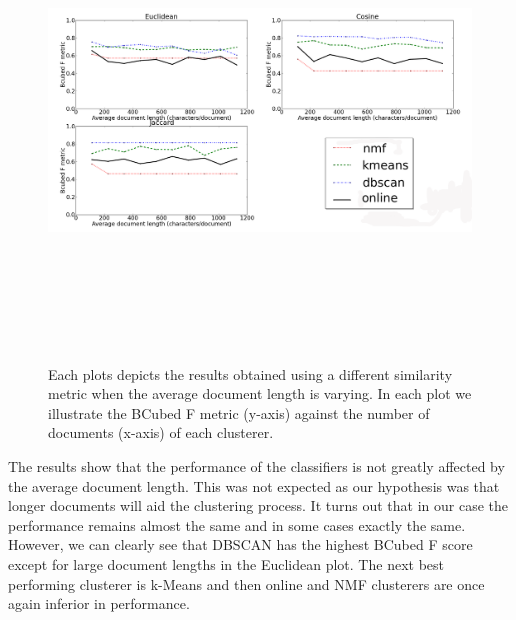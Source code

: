 \begin{figure}[htbp]
  \begin{center}
    \includegraphics[height=5in, width=6in]{average_document_length}
    \caption{Each plots depicts the results obtained using a different similarity metric when the average document length is varying. In each plot we illustrate the BCubed F metric (y-axis) against the number of documents (x-axis) of each clusterer.}
    \label{DifferentLengthResults}
  \end{center}
\end{figure}

\noindent The results show that the performance of the classifiers is not greatly affected by the average document length. This was not expected as our hypothesis was that longer documents will aid the clustering process. It turns out that in our case the performance remains almost the same and in some cases exactly the same. However, we can clearly see that DBSCAN has the highest BCubed F score except for large document lengths in the Euclidean plot. The next best performing clusterer is k-Means and then online and NMF clusterers are once again inferior in performance.    

